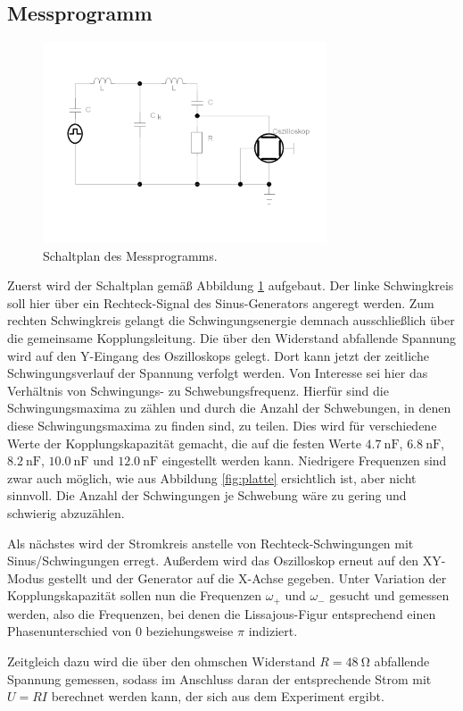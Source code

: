 \subsection{Messprogramm}
\begin{figure}
    \centering
    \includegraphics[width=0.75\textwidth]{plots/gekop_schw_kreis3.pdf}
    \caption{Schaltplan des Messprogramms.}
    \label{fig:messung_schweb}
\end{figure}
Zuerst wird der Schaltplan gemäß Abbildung \ref{fig:messung_schweb} aufgebaut. 
Der linke Schwingkreis soll hier über ein Rechteck-Signal des Sinus-Generators angeregt werden. 
Zum rechten Schwingkreis gelangt die Schwingungsenergie demnach ausschließlich über die gemeinsame Kopplungsleitung. 
Die über den Widerstand abfallende Spannung wird auf den Y-Eingang des Oszilloskops gelegt. 
Dort kann jetzt der zeitliche Schwingungsverlauf der Spannung verfolgt werden. 
Von Interesse sei hier das Verhältnis von Schwingungs- zu Schwebungsfrequenz. 
Hierfür sind die Schwingungsmaxima zu zählen und durch die Anzahl der Schwebungen, in denen diese Schwingungsmaxima zu finden 
sind, zu teilen. 
Dies wird für verschiedene Werte der Kopplungskapazität gemacht, die auf die festen Werte $\SI{4.7}{\nano\farad}$, 
$\SI{6.8}{\nano\farad}$, $\SI{8.2}{\nano\farad}$, $\SI{10.0}{\nano\farad}$ und $\SI{12.0}{\nano\farad}$ eingestellt werden kann.
Niedrigere Frequenzen sind zwar auch möglich, wie aus Abbildung \ref{fig:platte} ersichtlich ist, aber nicht sinnvoll. 
Die Anzahl der Schwingungen je Schwebung wäre zu gering und schwierig abzuzählen. 

Als nächstes wird der Stromkreis anstelle von Rechteck-Schwingungen mit Sinus\-/Schwingungen erregt. %
Außerdem wird das Oszilloskop erneut auf den XY-Modus gestellt und der Generator auf die X-Achse gegeben. 
Unter Variation der Kopplungskapazität sollen nun die Frequenzen $\omega _+$ und $\omega _-$ gesucht und gemessen werden, 
also die Frequenzen, bei denen die Lissajous-Figur entsprechend einen Phasenunterschied von $0$ beziehungsweise $\pi$ indiziert. 

Zeitgleich dazu wird die über den ohmschen Widerstand $R=\SI{48}{\ohm}$ abfallende Spannung gemessen, sodass im Anschluss 
daran der entsprechende Strom mit $U=RI$ berechnet werden kann, der sich aus dem Experiment ergibt. 